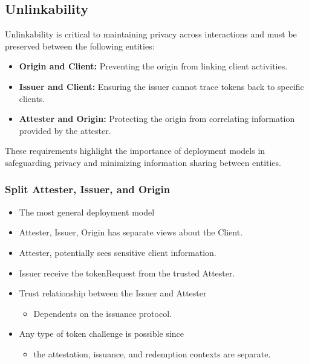 \subsection{Unlinkability}
Unlinkability is critical to maintaining privacy across interactions and must be preserved between the following entities:
\begin{itemize}
    \item \textbf{Origin and Client:} Preventing the origin from linking client activities.
    \item \textbf{Issuer and Client:} Ensuring the issuer cannot trace tokens back to specific clients.
    \item \textbf{Attester and Origin:} Protecting the origin from correlating information provided by the attester.
\end{itemize}

These requirements highlight the importance of deployment models in safeguarding privacy and minimizing information sharing between entities.


\subsubsection{Split Attester, Issuer, and Origin}
\begin{itemize}[topsep=0pt]
    \item The most general deployment model
    \item Attester, Issuer, Origin has separate views about the Client.
    \item Attester, potentially sees sensitive client information.
    \item Issuer receive the tokenRequest from the trusted Attester.
    \item Trust relationship between the Issuer and Attester
    \begin{itemize}
        \item Dependents on the issuance protocol.
     \end{itemize}
    \item Any type of token challenge is possible since
    \begin{itemize}
        \item the attestation, issuance, and redemption contexts are separate.
    \end{itemize}
\end{itemize}